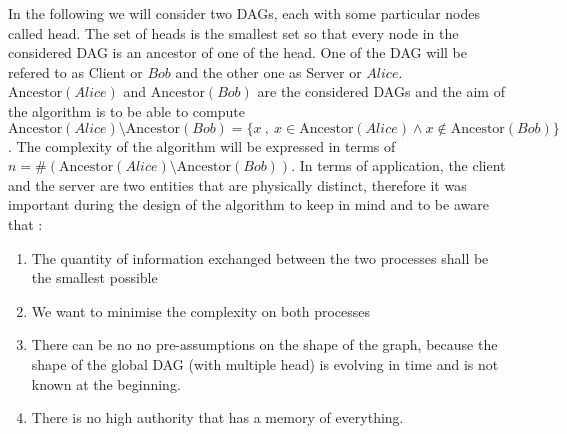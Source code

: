 In the following we will consider two DAGs, each with some particular nodes called head. The set of heads is the smallest set so that every node in the considered DAG is an ancestor of one of the head. One of the DAG will be refered to as Client or $Bob$ and the other one as Server or $Alice$. $\mathrm{Ancestor}(Alice)$ and $\mathrm{Ancestor}(Bob)$ are the considered DAGs and the aim of the algorithm is to be able to compute $\mathrm{Ancestor}(Alice) \setminus \mathrm{Ancestor}(Bob) = \{ x\ ,\ x \in \mathrm{Ancestor}(Alice) \wedge x \notin \mathrm{Ancestor}(Bob)\}$. The complexity of the algorithm will be expressed in terms of $n = \#(\mathrm{Ancestor}(Alice) \setminus \mathrm{Ancestor}(Bob))$. In terms of application, the client and the server are two entities that are physically distinct, therefore it was important during the design of the algorithm to keep in mind and to be aware that :
\begin{enumerate}
 \item The quantity of information exchanged between the two processes shall be the smallest possible
 \item We want to minimise the complexity on both processes
 \item There can be no no pre-assumptions on the shape of the graph, because the shape of the global DAG (with multiple head) is evolving in time and is not known at the beginning.
 \item There is no high authority that has a memory of everything.
\end{enumerate}
